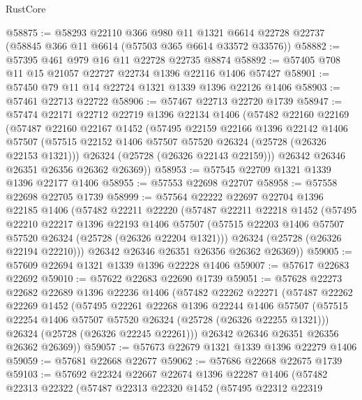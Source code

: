\begin{lexlean}{RustCore}
\begin{coremodule}
@58875 := @58293
    @22110
    @366
    @980
    @11
    @1321
    @6614
    @22728
    @22737
    (@58845 @366 @11 @6614 (@57503 @365 @6614 @33572 @33576))
@58882 := @57395 @461 @979 @16 @11 @22728 @22735 @8874
@58892 := @57405 @708 @11 @15 @21057 @22727 @22734 @1396 @22116 @1406 @57427
@58901 := @57450 @79 @11 @14 @22724 @1321 @1339 @1396 @22126 @1406
@58903 := @57461 @22713 @22722
@58906 := @57467 @22713 @22720 @1739
@58947 := @57474
    @22171
    @22712
    @22719
    @1396
    @22134
    @1406
    (@57482
      @22160
      @22169
      (@57487
        @22160
        @22167
        @1452
        (@57495
          @22159
          @22166
          @1396
          @22142
          @1406
          @57507
          (@57515 @22152 @1406 @57507 @57520 @26324 (@25728 (@26326 @22153 @1321)))
          @26324
          (@25728 (@26326 @22143 @22159)))
        @26342
        @26346
        @26351
        @26356
        @26362
        @26369))
@58953 := @57545 @22709 @1321 @1339 @1396 @22177 @1406
@58955 := @57553 @22698 @22707
@58958 := @57558 @22698 @22705 @1739
@58999 := @57564
    @22222
    @22697
    @22704
    @1396
    @22185
    @1406
    (@57482
      @22211
      @22220
      (@57487
        @22211
        @22218
        @1452
        (@57495
          @22210
          @22217
          @1396
          @22193
          @1406
          @57507
          (@57515 @22203 @1406 @57507 @57520 @26324 (@25728 (@26326 @22204 @1321)))
          @26324
          (@25728 (@26326 @22194 @22210)))
        @26342
        @26346
        @26351
        @26356
        @26362
        @26369))
@59005 := @57609 @22694 @1321 @1339 @1396 @22228 @1406
@59007 := @57617 @22683 @22692
@59010 := @57622 @22683 @22690 @1739
@59051 := @57628
    @22273
    @22682
    @22689
    @1396
    @22236
    @1406
    (@57482
      @22262
      @22271
      (@57487
        @22262
        @22269
        @1452
        (@57495
          @22261
          @22268
          @1396
          @22244
          @1406
          @57507
          (@57515 @22254 @1406 @57507 @57520 @26324 (@25728 (@26326 @22255 @1321)))
          @26324
          (@25728 (@26326 @22245 @22261)))
        @26342
        @26346
        @26351
        @26356
        @26362
        @26369))
@59057 := @57673 @22679 @1321 @1339 @1396 @22279 @1406
@59059 := @57681 @22668 @22677
@59062 := @57686 @22668 @22675 @1739
@59103 := @57692
    @22324
    @22667
    @22674
    @1396
    @22287
    @1406
    (@57482
      @22313
      @22322
      (@57487
        @22313
        @22320
        @1452
        (@57495
          @22312
          @22319

\end{coremodule}
\end{lexlean}

